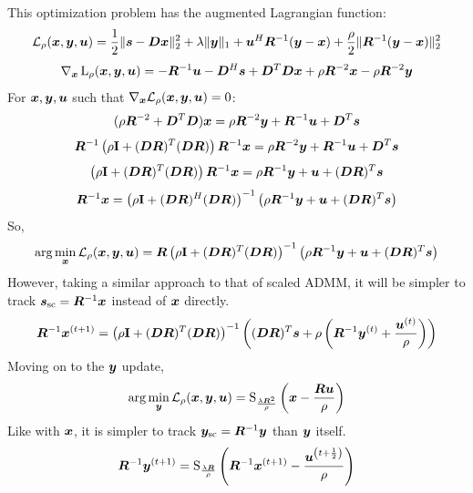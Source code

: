 This optimization problem has the augmented Lagrangian function:
%
\begin{equation}
\mathcal{L}_{\rho}(\bm{x},\bm{y},\bm{u}) = \frac{1}{2}\|\bm{s} - \bm{D}\bm{x}\|_2^2 + \lambda\|\bm{y}\|_1 + \bm{u}^H\bm{R}^{-1}(\bm{y} - \bm{x})  + \frac{\rho}{2}\|\bm{R}^{-1}(\bm{y} - \bm{x})\|_2^2
\end{equation} 
%
\begin{equation}
\nabla_{\bm{x}}\operatorname{L}_{\rho}(\bm{x},\bm{y},\bm{u}) = -\bm{R}^{-1}\bm{u} - \bm{D}^H\bm{s} + \bm{D}^T\bm{D}\bm{x} + \rho\bm{R}^{-2}\bm{x} - \rho\bm{R}^{-2}\bm{y}
\end{equation}
%
For $\bm{x},\bm{y},\bm{u}$ such that $\nabla_{\bm{x}}\mathcal{L}_{\rho}(\bm{x},\bm{y},\bm{u}) = 0$:
%
\begin{equation}
(\rho\bm{R}^{-2} + \bm{D}^T\bm{D})\bm{x} = \rho\bm{R}^{-2}\bm{y} + \bm{R}^{-1} \bm{u} + \bm{D}^T\bm{s}
\end{equation}
%
\begin{equation}
\bm{R}^{-1}\left(\rho{\bf I} + (\bm{D}\bm{R})^T(\bm{D}\bm{R})\right)\bm{R}^{-1}\bm{x} = \rho\bm{R}^{-2}\bm{y} + \bm{R}^{-1}\bm{u} + \bm{D}^T\bm{s}
\end{equation}
%
\begin{equation}
\left(\rho{\bf I} + (\bm{D}\bm{R})^T(\bm{D}\bm{R})\right)\bm{R}^{-1}\bm{x} = \rho\bm{R}^{-1}\bm{y} + \bm{u} + (\bm{D}\bm{R})^T\bm{s}
\end{equation}
%
\begin{equation}
\bm{R}^{-1}\bm{x} = \left(\rho{\bf I} + (\bm{D}\bm{R})^H(\bm{D}\bm{R})\right)^{-1}\left(\rho\bm{R}^{-1}\bm{y} + \bm{u} + (\bm{D}\bm{R})^T\bm{s}\right)
\end{equation}
%
So,
%
\begin{equation}
\arg\min_{\bm{x}} \mathcal{L}_{\rho}(\bm{x},\bm{y},\bm{u}) = \bm{R}\left(\rho{\bf I} + (\bm{D}\bm{R})^T(\bm{D}\bm{R})\right)^{-1}\left(\rho\bm{R}^{-1}\bm{y} + \bm{u} + (\bm{D}\bm{R})^T\bm{s}\right)
\end{equation}
%
However, taking a similar approach to that of scaled ADMM, it will be simpler to track $\bm{s}_{\text{sc}} = \bm{R}^{-1}\bm{x}$ instead of $\bm{x}$ directly.
%
\begin{equation}
\bm{R}^{-1}\bm{x}^{(t + 1)} = \left(\rho{\bf I} + (\bm{D}\bm{R})^T(\bm{D}\bm{R})\right)^{-1}\left((\bm{D}\bm{R})^T\bm{s} + \rho\left(\bm{R}^{-1}\bm{y}^{(t)} + \frac{\bm{u}^{(t)}}{\rho}\right)\right)
\end{equation}
%
Moving on to the $\bm{y}$ update,
%
\begin{equation}
\arg\min_{\bm{y}} \mathcal{L}_{\rho}(\bm{x},\bm{y},\bm{u}) = \operatorname{S}_{\frac{\lambda\bm{R}^2}{\rho}}\left(\bm{x} - \frac{\bm{R}\bm{u}}{\rho}\right)
\end{equation}
%
Like with $\bm{x}$, it is simpler to track $\bm{y}_{\text{sc}} = \bm{R}^{-1}\bm{y}$ than $\bm{y}$ itself.
%
\begin{equation}
\bm{R}^{-1}\bm{y}^{(t + 1)}= \operatorname{S}_{\frac{\lambda\bm{R}}{\rho}}\left(\bm{R}^{-1}\bm{x}^{(t + 1)} - \frac{\bm{u}^{\left(t + \frac{1}{2}\right)}}{\rho}\right)
\end{equation}
